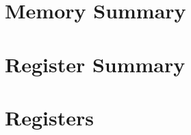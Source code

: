 \documentclass[main\_\_EN.tex]{subfiles}
\begin{document}

\section{ Memory Summary}\label{Memorylist}



\hypertarget{rsa-reg-summ}{}
\section{ Register Summary }




\section{ Registers }


\end{document}
